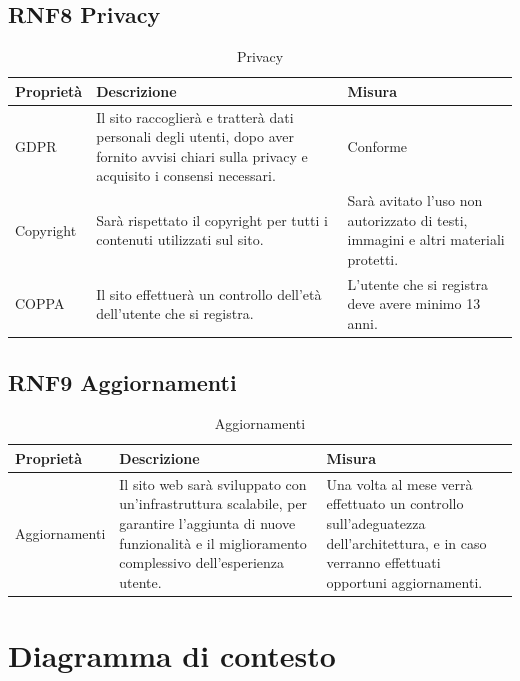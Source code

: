 \documentclass[a4paper,12pt]{article}
\begin{document}
\subsection*{RNF8 Privacy}
\begin{table}[H]
    \centering
    \begin{tabular}{|p{}|p{}|p{}|}
        \hline  
         Proprietà & Descrizione & Misura\\
         \hline      
         GDPR
         & Il sito raccoglierà e tratterà dati
        personali degli utenti, dopo aver fornito avvisi chiari sulla privacy e acquisito i consensi necessari.
         &Conforme\\ \hline
         Copyright
         & Sarà rispettato il copyright per tutti i contenuti utilizzati sul sito.
         &Sarà avitato l’uso non autorizzato di testi, immagini e altri materiali protetti.\\ \hline
         COPPA
         & Il sito effettuerà un controllo dell’età dell’utente che si registra.
         &L'utente che si registra deve avere minimo 13 anni.\\ \hline
    \end{tabular}
    \caption{Privacy}
\end{table}


\subsection*{RNF9 Aggiornamenti} 
\begin{table}[H]
    \centering
    \begin{tabular}{|p{}|p{}|p{}|}
        \hline  
         Proprietà & Descrizione & Misura\\
         \hline      
         Aggiornamenti
         & Il sito web sarà sviluppato con un'infrastruttura scalabile, per garantire l'aggiunta di nuove funzionalità e il miglioramento complessivo dell'esperienza utente.
         & Una volta al mese verrà effettuato un controllo sull'adeguatezza dell'architettura, e in caso verranno effettuati opportuni aggiornamenti.\\ \hline
    \end{tabular}
    \caption{Aggiornamenti}
\end{table}
 


\newpage

\section{Diagramma di contesto}
\end{document}
